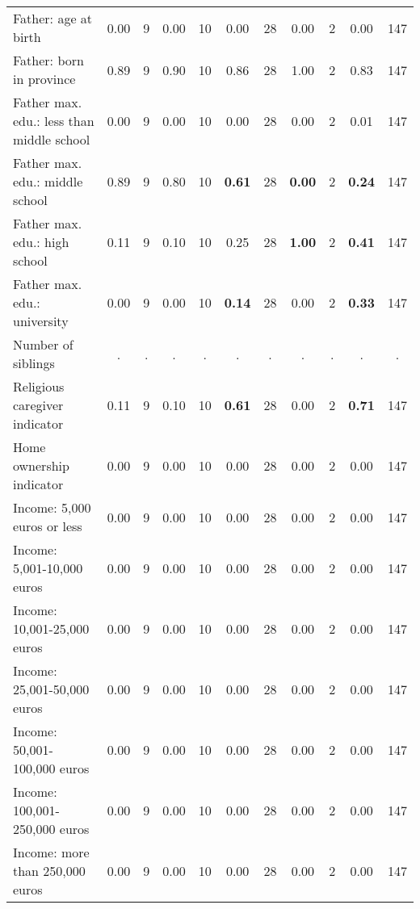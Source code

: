 \begin{tabular}{l c c c c c c c c c c}
Father: age at birth &      0.00 &         9 &      0.00 &        10 &      0.00 &        28 &      0.00 &         2 &      0.00 &       147 \\
Father: born in province &      0.89 &         9 &      0.90 &        10 &      0.86 &        28 &      1.00 &         2 &      0.83 &       147 \\
Father max. edu.: less than middle school &      0.00 &         9 &      0.00 &        10 &      0.00 &        28 &      0.00 &         2 &      0.01 &       147 \\
Father max. edu.: middle school &      0.89 &         9 &      0.80 &        10 & \textbf{     0.61} &        28 & \textbf{     0.00} &         2 & \textbf{     0.24} &       147 \\
Father max. edu.: high school &      0.11 &         9 &      0.10 &        10 &      0.25 &        28 & \textbf{     1.00} &         2 & \textbf{     0.41} &       147 \\
Father max. edu.: university &      0.00 &         9 &      0.00 &        10 & \textbf{     0.14} &        28 &      0.00 &         2 & \textbf{     0.33} &       147 \\
Number of siblings &         . & . &         . & . &         . & . &         . & . &         . & . \\
Religious caregiver indicator &      0.11 &         9 &      0.10 &        10 & \textbf{     0.61} &        28 &      0.00 &         2 & \textbf{     0.71} &       147 \\
Home ownership indicator &      0.00 &         9 &      0.00 &        10 &      0.00 &        28 &      0.00 &         2 &      0.00 &       147 \\
Income: 5,000 euros or less &      0.00 &         9 &      0.00 &        10 &      0.00 &        28 &      0.00 &         2 &      0.00 &       147 \\
Income: 5,001-10,000 euros &      0.00 &         9 &      0.00 &        10 &      0.00 &        28 &      0.00 &         2 &      0.00 &       147 \\
Income: 10,001-25,000 euros &      0.00 &         9 &      0.00 &        10 &      0.00 &        28 &      0.00 &         2 &      0.00 &       147 \\
Income: 25,001-50,000 euros &      0.00 &         9 &      0.00 &        10 &      0.00 &        28 &      0.00 &         2 &      0.00 &       147 \\
Income: 50,001-100,000 euros &      0.00 &         9 &      0.00 &        10 &      0.00 &        28 &      0.00 &         2 &      0.00 &       147 \\
Income: 100,001-250,000 euros &      0.00 &         9 &      0.00 &        10 &      0.00 &        28 &      0.00 &         2 &      0.00 &       147 \\
Income: more than 250,000 euros &      0.00 &         9 &      0.00 &        10 &      0.00 &        28 &      0.00 &         2 &      0.00 &       147 \\
\bottomrule
\end{tabular}
